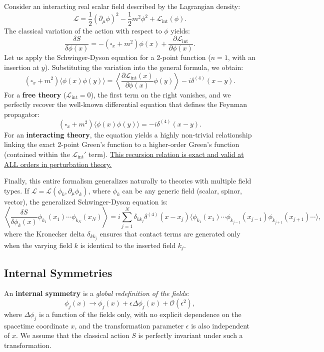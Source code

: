 \begin{example}
    Consider an interacting real scalar field described by the Lagrangian density:
    \[
        \mathcal{L} = \frac{1}{2}(\partial_\mu \phi)^2 - \frac{1}{2}m^2 \phi^2 + \mathcal{L}_{\text{int}}(\phi).
    \]
    The classical variation of the action with respect to $\phi$ yields:
    \[
        \frac{\delta S}{\delta \phi(x)} = -(\square_x + m^2)\phi(x) + \frac{\partial \mathcal{L}_{\text{int}}}{\partial \phi(x)}.
    \]
    Let us apply the Schwinger-Dyson equation for a 2-point function ($n=1$, with an insertion at $y$). Substituting the variation into the general formula, we obtain:
    \[
        (\square_x + m^2) \langle \phi(x) \phi(y) \rangle = \left\langle \frac{\partial \mathcal{L}_{\text{int}}(x)}{\partial \phi(x)} \phi(y) \right\rangle - i \delta^{(4)}(x - y).
    \]
    For a \textbf{free theory} ($\mathcal{L}_{\text{int}} = 0$), the first term on the right vanishes, and we perfectly recover the well-known differential equation that defines the Feynman propagator:
    \[
        (\square_x + m^2) \langle \phi(x) \phi(y) \rangle = -i \delta^{(4)}(x - y).
    \]
    For an \textbf{interacting theory}, the equation yields a highly non-trivial relationship linking the exact 2-point Green's function to a higher-order Green's function (contained within the $\mathcal{L}_{\text{int}}'$ term). \uline{This recursion relation is exact and valid at ALL orders in perturbation theory.}
\end{example}

Finally, this entire formalism generalizes naturally to theories with multiple field types. If $\mathcal{L} = \mathcal{L}(\phi_k, \partial_\mu \phi_k)$, where $\phi_k$ can be any generic field (scalar, spinor, vector), the generalized Schwinger-Dyson equation is:
\[
    \left\langle \frac{\delta S}{\delta \phi_k(x)} \phi_{k_1}(x_1) \cdots \phi_{k_N}(x_N) \right\rangle = i \sum_{j=1}^N \delta_{k k_j} \delta^{(4)}(x - x_j) \langle \phi_{k_1}(x_1) \cdots \phi_{k_{j-1}}(x_{j-1}) \phi_{k_{j+1}}(x_{j+1}) \cdots \rangle,
\]
where the Kronecker delta $\delta_{k k_j}$ ensures that contact terms are generated only when the varying field $k$ is identical to the inserted field $k_j$.

\subsection{Internal Symmetries}

An \textbf{internal symmetry} is a \textit{global redefinition of the fields}:
\[
    \phi_j(x) \to \phi_j(x) + \epsilon \Delta\phi_j(x) + \mathcal{O}(\epsilon^2),
\]
where $\Delta\phi_j$ is a function of the fields only, with no explicit dependence on the spacetime coordinate $x$, and the transformation parameter $\epsilon$ is also independent of $x$. We assume that the classical action $S$ is perfectly invariant under such a transformation.

